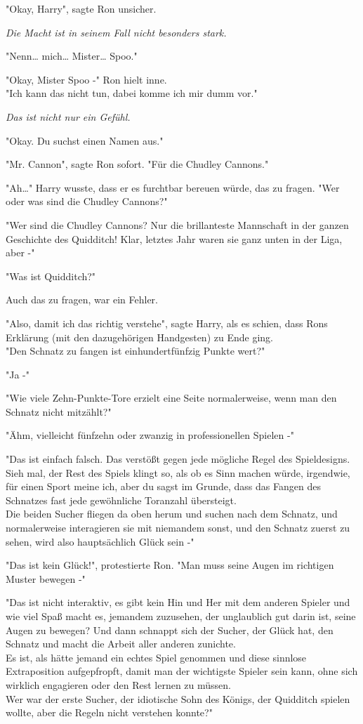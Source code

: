 {"Okay, Harry", sagte Ron unsicher.

\emph{Die Macht ist in seinem Fall nicht besonders stark.}

"Nenn… mich… Mister… Spoo."

"Okay, Mister Spoo -" Ron hielt inne.\\ "Ich kann das nicht tun, dabei komme ich mir dumm vor."

\emph{Das ist nicht nur ein Gefühl.}

"Okay. Du suchst einen Namen aus."

"Mr. Cannon", sagte Ron sofort. "Für die Chudley Cannons."

"Ah…" Harry wusste, dass er es furchtbar bereuen würde, das zu fragen. "Wer oder was sind die Chudley Cannons?"

"Wer sind die Chudley Cannons? Nur die brillanteste Mannschaft in der ganzen Geschichte des Quidditch! Klar, letztes Jahr waren sie ganz unten in der Liga, aber -"

"Was ist Quidditch?"

Auch das zu fragen, war ein Fehler.

"Also, damit ich das richtig verstehe", sagte Harry, als es schien, dass Rons Erklärung (mit den dazugehörigen Handgesten) zu Ende ging.\\ "Den Schnatz zu fangen ist einhundertfünfzig Punkte wert?"

"Ja -"

"Wie viele Zehn-Punkte-Tore erzielt eine Seite normalerweise, wenn man den Schnatz nicht mitzählt?"

"Ähm, vielleicht fünfzehn oder zwanzig in professionellen Spielen -"

"Das ist einfach falsch. Das verstößt gegen jede mögliche Regel des Spieldesigns. Sieh mal, der Rest des Spiels klingt so, als ob es Sinn machen würde, irgendwie, für einen Sport meine ich, aber du sagst im Grunde, dass das Fangen des Schnatzes fast jede gewöhnliche Toranzahl übersteigt.\\ Die beiden Sucher fliegen da oben herum und suchen nach dem Schnatz, und normalerweise interagieren sie mit niemandem sonst, und den Schnatz zuerst zu sehen, wird also hauptsächlich Glück sein -"

"Das ist kein Glück!", protestierte Ron. "Man muss seine Augen im richtigen Muster bewegen -"

"Das ist nicht interaktiv, es gibt kein Hin und Her mit dem anderen Spieler und wie viel Spaß macht es, jemandem zuzusehen, der unglaublich gut darin ist, seine Augen zu bewegen? Und dann schnappt sich der Sucher, der Glück hat, den Schnatz und macht die Arbeit aller anderen zunichte.\\ Es ist, als hätte jemand ein echtes Spiel genommen und diese sinnlose Extraposition aufgepfropft, damit man der wichtigste Spieler sein kann, ohne sich wirklich engagieren oder den Rest lernen zu müssen.\\ Wer war der erste Sucher, der idiotische Sohn des Königs, der Quidditch spielen wollte, aber die Regeln nicht verstehen konnte?"

}
